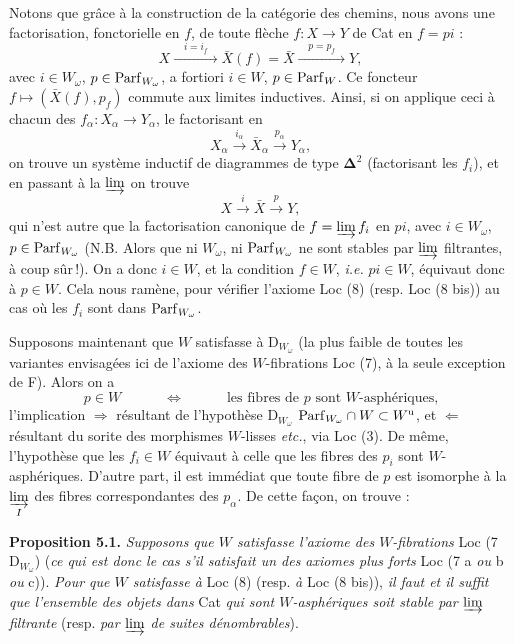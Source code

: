 Notons que grâce à la construction de la catégorie des chemins, nous avons une factorisation, fonctorielle en $f$, de toute flèche $f : X \longrightarrow Y$ de Cat en $f = pi$ :
\[
X \xrightarrow{\quad i = i_f\quad} \bar{X}(f) = \bar{X} \xrightarrow{\quad p = p_f\quad} Y,
\]
avec $i \in W_\omega$, $p \in \mathrm{Parf}_{W_\omega}$, a fortiori $i \in W$, $p \in \mathrm{Parf}_W$. Ce foncteur $f \longmapsto (\bar{X}(f), p_f)$ commute aux limites inductives. Ainsi, si on applique ceci à chacun des $f_\alpha : X_\alpha \longrightarrow Y_\alpha$, le factorisant en
\[
X_\alpha \xrightarrow{i_\alpha} \bar{X}_\alpha \xrightarrow{p_\alpha} Y_\alpha,
\]
on trouve un système inductif de diagrammes de type $\boldsymbol{\Delta}^2$ (factorisant les $f_i$), et en passant à la $\varinjlim$ on trouve
\[
X \xrightarrow{i} \bar{X} \xrightarrow{p} Y,
\]
qui n'est autre que la factorisation canonique
de $f = \varinjlim f_i$ en $pi$, avec $i \in W_\omega$, $p \in \mathrm{Parf}_{W_\omega}$ (N.B. Alors que ni $W_\omega$, ni $\mathrm{Parf}_{W_\omega}$ ne sont stables par $\varinjlim$ filtrantes, à coup sûr\,!). On a donc $i \in W$, et la condition $f \in W$, \textit{i.e.} $pi \in W$, équivaut donc à $p \in W$. Cela nous ramène, pour vérifier l'axiome Loc (8) (resp. Loc (8 bis)) au cas où les $f_i$ sont dans $\mathrm{Parf}_{W_\omega}$.

Supposons maintenant que $W$ satisfasse à $\mathrm{D}_{W_\omega}$ (la plus faible de toutes les variantes envisagées ici de l'axiome des $W$-fibrations Loc (7), à la seule exception de F). Alors on a
\[
p \in W \qquad\quad \Longleftrightarrow \qquad\quad \text{les fibres de $p$ sont $W$-asphériques,}
\]
l'implication $\Longrightarrow$ résultant de l'hypothèse $\mathrm{D}_{W_\omega}$ $\mathrm{Parf}_{W_\omega} \cap W \subset W^{\mathrm{u}}$, et $\Longleftarrow$ résultant du sorite des morphismes $W$-lisses \textit{etc.}, via Loc (3). De même, l'hypothèse que les $f_i \in W$ équivaut à celle que les fibres des $p_i$ sont $W$-asphériques. D'autre part, il est immédiat que
toute fibre de $p$ est isomorphe à la $\varinjlim\limits_{I}$ des fibres correspondantes des $p_\alpha$. De cette façon, on trouve :

\textbf{Proposition 5.1.} \textit{Supposons que $W$ satisfasse l'axiome des $W$-fibrations} Loc (7 $\mathrm{D}_{W_\omega}$) (\textit{ce qui est donc le cas s'il satisfait un des axiomes plus forts} Loc (7 a \textit{ou} b \textit{ou} c)). \textit{Pour que $W$ satisfasse à} Loc (8) (resp. \textit{à} Loc (8 bis)), \textit{il faut et il suffit que l'ensemble des objets dans} Cat \textit{qui sont $W$-asphériques soit stable par $\varinjlim$ filtrante} (resp. \textit{par $\varinjlim$ de suites dénombrables}).


